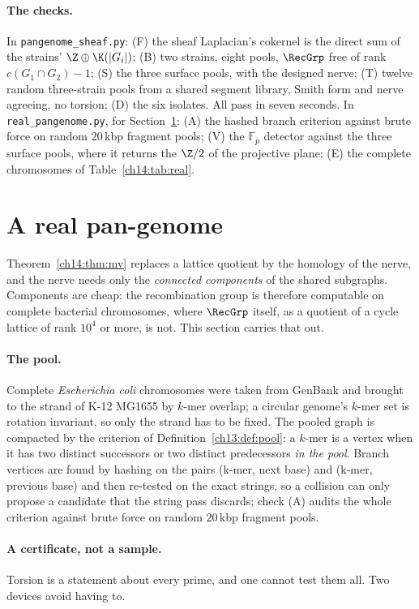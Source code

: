 \paragraph{The checks.} In \texttt{pangenome\_sheaf.py}: (F) the sheaf Laplacian's cokernel is
the direct sum of the strains' $\Z\oplus\K(|G_i|)$; (B) two strains, eight pools, $\RecGrp$ free
of rank $c(G_1\cap G_2)-1$; (S) the three surface pools, with the designed nerve; (T) twelve
random three-strain pools from a shared segment library, Smith form and nerve agreeing, no
torsion; (D) the six isolates. All pass in seven seconds. In \texttt{real\_pangenome.py},
for Section~\ref{ch14:sec:real}: (A) the hashed branch criterion against brute force on random
$20$\,kbp fragment pools; (V) the $\mathbb F_p$ detector against the three surface pools,
where it returns the $\Z/2$ of the projective plane; (E) the complete chromosomes of
Table~\ref{ch14:tab:real}.

\section{A real pan-genome}\label{ch14:sec:real}

Theorem~\ref{ch14:thm:mv} replaces a lattice quotient by the homology of the nerve, and the nerve
needs only the \emph{connected components} of the shared subgraphs. Components are cheap:
the recombination group is therefore computable on complete bacterial chromosomes, where
$\RecGrp$ itself, as a quotient of a cycle lattice of rank $10^4$ or more, is not. This section
carries that out.

\paragraph{The pool.} Complete \emph{Escherichia coli} chromosomes were taken from GenBank
and brought to the strand of K-12 MG1655 by $k$-mer overlap; a circular genome's $k$-mer set
is rotation invariant, so only the strand has to be fixed. The pooled graph is compacted by
the criterion of Definition~\ref{ch13:def:pool}: a $k$-mer is a vertex when it has two distinct successors or
two distinct predecessors \emph{in the pool}. Branch vertices are found by hashing on the
pairs (k-mer, next base) and (k-mer, previous base) and then re-tested on the exact strings,
so a collision can only propose a candidate that the string pass discards; check (A) audits
the whole criterion against brute force on random $20$\,kbp fragment pools.

\paragraph{A certificate, not a sample.} Torsion is a statement about every prime, and one
cannot test them all. Two devices avoid having to.

